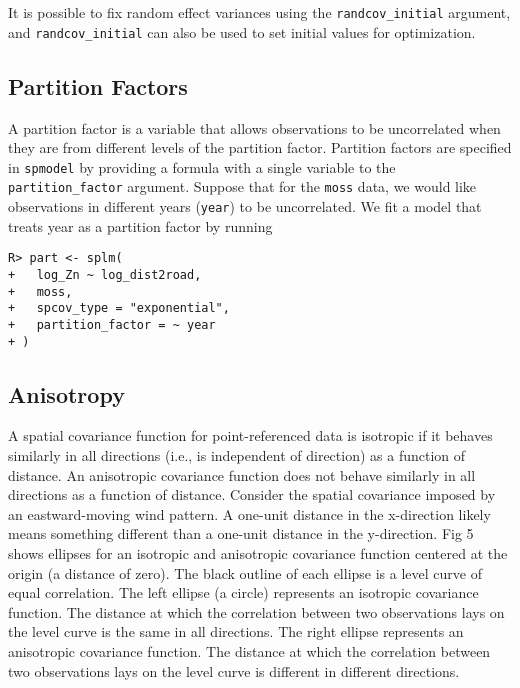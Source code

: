 \documentclass[10pt,letterpaper]{article}
\begin{document}
It is possible to fix random effect variances using the
\texttt{randcov\_initial} argument, and \texttt{randcov\_initial} can
also be used to set initial values for optimization.

\hypertarget{partition-factors}{%
\subsection{Partition Factors}\label{partition-factors}}

A partition factor is a variable that allows observations to be
uncorrelated when they are from different levels of the partition
factor. Partition factors are specified in \texttt{spmodel} by providing
a formula with a single variable to the \texttt{partition\_factor}
argument. Suppose that for the \texttt{moss} data, we would like
observations in different years (\texttt{year}) to be uncorrelated. We
fit a model that treats year as a partition factor by running

\begin{verbatim}
R> part <- splm(
+   log_Zn ~ log_dist2road,
+   moss,
+   spcov_type = "exponential",
+   partition_factor = ~ year
+ )
\end{verbatim}

\hypertarget{sec:anisotropy}{%
\subsection{Anisotropy}\label{sec:anisotropy}}

A spatial covariance function for point-referenced data is isotropic if
it behaves similarly in all directions (i.e., is independent of
direction) as a function of distance. An anisotropic covariance function
does not behave similarly in all directions as a function of distance.
Consider the spatial covariance imposed by an eastward-moving wind
pattern. A one-unit distance in the x-direction likely means something
different than a one-unit distance in the y-direction. Fig 5 shows
ellipses for an isotropic and anisotropic covariance function centered
at the origin (a distance of zero). The black outline of each ellipse is
a level curve of equal correlation. The left ellipse (a circle)
represents an isotropic covariance function. The distance at which the
correlation between two observations lays on the level curve is the same
in all directions. The right ellipse represents an anisotropic
covariance function. The distance at which the correlation between two
observations lays on the level curve is different in different
directions.
\end{document}
